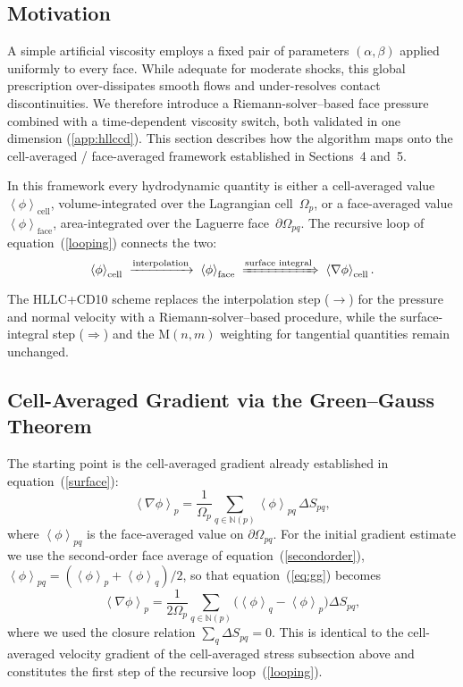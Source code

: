 \documentclass[twocolumn]{aastex63}
\newcommand{\surf}[0]{S}
\begin{document}
\subsection{Motivation}

A simple artificial viscosity employs a fixed pair of
parameters $(\alpha,\beta)$ applied uniformly to every face.
While adequate for moderate shocks, this global prescription
over-dissipates smooth flows and under-resolves contact
discontinuities.
We therefore introduce a Riemann-solver--based face pressure
combined with a time-dependent viscosity switch, both validated
in one dimension (\ref{app:hllccd}).
This section describes how the algorithm maps onto the
cell-averaged / face-averaged framework established in Sections~4
and~5.

In this framework every hydrodynamic quantity is either a
cell-averaged value
$\left<\phi\right>_\textrm{cell}$, volume-integrated over the
Lagrangian cell~$\Omega_p$, or a face-averaged value
$\left<\phi\right>_\textrm{face}$, area-integrated over the
Laguerre face~$\partial\Omega_{pq}$.
The recursive loop of equation~(\ref{looping}) connects the two:
\begin{equation*}
  \left<\phi\right>_\textrm{cell}
    \;\xrightarrow{\text{interpolation}}\;
  \left<\phi\right>_\textrm{face}
    \;\xRightarrow{\text{surface integral}}\;
  \left<\nabla\phi\right>_\textrm{cell}.
\end{equation*}
The HLLC+CD10 scheme replaces the interpolation step
($\rightarrow$) for the pressure and normal velocity
with a Riemann-solver--based procedure, while the
surface-integral step ($\Rightarrow$) and the
M$(n,m)$ weighting for tangential quantities remain unchanged.


\subsection{Cell-Averaged Gradient via the Green--Gauss Theorem}

The starting point is the cell-averaged gradient already
established in equation~(\ref{surface}):
\begin{equation}\label{eq:gg}
  \left<\nabla\phi\right>_p
  = \frac{1}{\Omega_p}
    \sum_{q\in\mathbb{N}(p)}
      \left<\phi\right>_{pq}\,\Delta\surf_{pq},
\end{equation}
where $\left<\phi\right>_{pq}$ is the face-averaged value on
$\partial\Omega_{pq}$.
For the initial gradient estimate we use the second-order
face average of equation~(\ref{secondorder}),
$\left<\phi\right>_{pq} = (\left<\phi\right>_p + \left<\phi\right>_q)/2$,
so that equation~(\ref{eq:gg}) becomes
\begin{equation}\label{eq:gg2}
  \left<\nabla\phi\right>_p
  = \frac{1}{2\Omega_p}
    \sum_{q\in\mathbb{N}(p)}
      \bigl(\left<\phi\right>_q - \left<\phi\right>_p\bigr)
      \Delta\surf_{pq},
\end{equation}
where we used the closure relation
$\sum_q \Delta\surf_{pq} = 0$.
This is identical to the cell-averaged velocity gradient
of the cell-averaged stress subsection above and constitutes the first step of the
recursive loop~(\ref{looping}).
\end{document}

